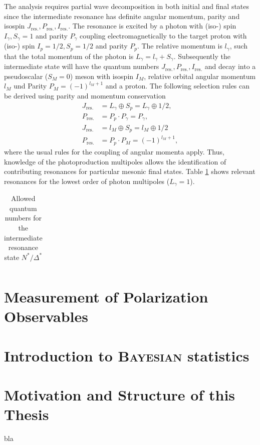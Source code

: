 The analysis requires partial wave decomposition in both initial and final states \cite{Drechsel} since the intermediate resonance has definite angular momentum, parity  and isospin $J_\text{res.}, P_\text{res.}, I_\text{res.}$. The resonance is excited by a photon with (iso-) spin $I_\gamma,S_\gamma =1$ and parity $P_\gamma$ coupling electromagnetically to the target proton with (iso-) spin $I_p=1/2,S_p=1/2$ and parity $P_p$. The relative momentum is $l_\gamma$, such that the total momentum of the photon is $L_\gamma=l_\gamma+S_\gamma$. Subsequently the intermediate state will have the quantum numbers $J_\text{res.}, P_\text{res.}, I_\text{res.}$ and decay into a pseudoscalar ($S_M=0$) meson with isospin $I_M$, relative orbital angular momentum $l_M$ und Parity $P_M=(-1)^{l_M+1}$ and a proton. The following selection rules can be derived using parity and momentum conservation \cite{Krusche,farahphd}
\begin{align}
	J_\text{res.}&=L_\gamma\oplus S_p = L_\gamma\oplus 1/2,\\
	P_\text{res.}&=P_p\cdot P_\gamma=P_\gamma,\\
	J_\text{res.}&=l_M\oplus S_p = l_M\oplus 1/2\\
	P_\text{res.}&=P_p\cdot P_M=(-1)^{l_M+1},
\end{align}
where the usual rules for the coupling of angular momenta \cite{theo3} apply. Thus, knowledge of the photoproduction multipoles allows the identification of contributing resonances for particular mesonic final states. Table \ref{tab:qn} shows relevant resonances for the lowest order of photon multipoles ($L_\gamma=1$).

\begin{table}[htbp]
	\begin{tabular}{cccccc}
	\end{tabular}
\caption{Allowed quantum numbers for the intermediate resonance state $N^*/\Delta^*$}
\label{tab:qn}
\end{table}

\section{Measurement of Polarization Observables}

\section{Introduction to \textsc{Bayesian} statistics}

\section{Motivation and Structure of this Thesis}
bla
